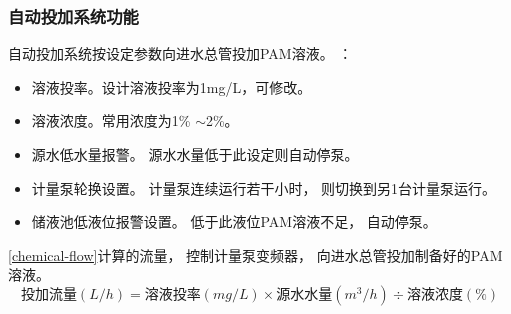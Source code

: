 
      \subsubsection{自动投加系统功能}
         自动投加系统按设定参数向进水总管投加PAM溶液。
         ：
         \begin{itemize}
            \item 溶液投率。设计溶液投率为1mg/L，可修改。
            \item 溶液浓度。常用浓度为1\% $\sim$2\%。
            \item 源水低水量报警。
            源水水量低于此设定则自动停泵。
            \item 计量泵轮换设置。
            计量泵连续运行若干小时，
            则切换到另1台计量泵运行。
            \item 储液池低液位报警设置。
            低于此液位PAM溶液不足，
            自动停泵。
         \end{itemize}
         \ref{chemical-flow}计算的流量，
         控制计量泵变频器，
         向进水总管投加制备好的PAM溶液。
         \begin{equation}
            \label{chemical-flow}
            \mbox{投加流量}(L/h) = \mbox{溶液投率}(mg/L) \times 
            \mbox{源水水量}(m^3/h) \div 
            \mbox{溶液浓度}(\%)
         \end{equation}

